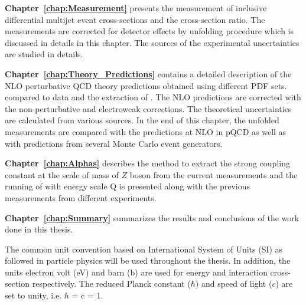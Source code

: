 {\bf Chapter~\ref{chap:Measurement}} presents the measurement of inclusive differential multijet event cross-sections and the cross-section ratio. The measurements are corrected for detector effects by unfolding procedure which is discussed in details in this chapter. The sources of the experimental uncertainties are studied in details. 

{\bf Chapter~\ref{chap:Theory_Predictions}} contains a detailed description of the NLO perturbative QCD theory predictions obtained using different PDF sets. compared to data and the extraction of \alps. The NLO predictions are corrected with the non-perturbative and electroweak corrections. The theoretical uncertainties are calculated from various sources. In the end of this chapter, the unfolded measurements are compared with the predictions at NLO in pQCD as well as with predictions from several Monte Carlo event generators.

{\bf Chapter~\ref{chap:Alphas}} describes the method to extract the strong coupling constant at the scale of mass of $Z$ boson \alpsmz from the current measurements and the running of \alps with energy scale Q is presented along with the previous measurements from different experiments.

{\bf Chapter~\ref{chap:Summary}} summarizes the results and conclusions of the work done in this thesis.

The common unit convention based on International System of Units (SI) as followed in particle physics will be used throughout the thesis. In addition, the units electron volt (eV) and barn (b) are used for energy and interaction cross-section respectively. The reduced Planck constant ($\hbar$) and speed of light ($c$) are set to unity, i.e. $\hbar$ = c = 1.
